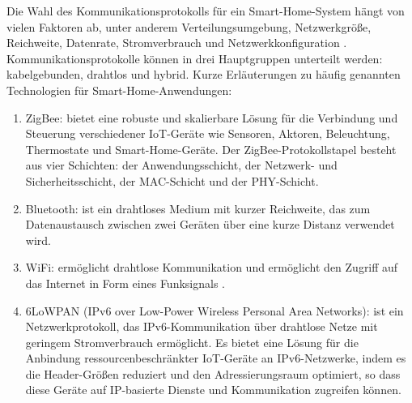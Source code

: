 Die Wahl des Kommunikationsprotokolls für ein Smart-Home-System hängt von vielen Faktoren ab, unter anderem Verteilungsumgebung, Netzwerkgröße, Reichweite, Datenrate, Stromverbrauch und Netzwerkkonfiguration \cite{djumanazarov2021overview}\cite{khatoun2022cybersecurity}. Kommunikationsprotokolle können in drei Hauptgruppen unterteilt werden: kabelgebunden, drahtlos und hybrid. Kurze Erläuterungen zu häufig genannten Technologien für Smart-Home-Anwendungen:
\begin{enumerate}
    \item ZigBee: bietet eine robuste und skalierbare Lösung für die Verbindung und Steuerung verschiedener IoT-Geräte wie Sensoren, Aktoren, Beleuchtung, Thermostate und Smart-Home-Geräte\cite{8203943}\cite{khatoun2022cybersecurity}.  Der ZigBee-Protokollstapel besteht aus vier Schichten: der Anwendungsschicht, der Netzwerk- und Sicherheitsschicht, der MAC-Schicht und der PHY-Schicht\cite{8203943}. 
    \item Bluetooth: ist ein drahtloses Medium mit kurzer Reichweite, das zum Datenaustausch zwischen zwei Geräten über eine kurze Distanz verwendet wird\cite{khatoun2022cybersecurity}. 

    \item WiFi: ermöglicht drahtlose Kommunikation und ermöglicht den Zugriff auf das Internet in Form eines Funksignals \cite{8203943}.

      \item 6LoWPAN (IPv6 over Low-Power Wireless Personal Area Networks): ist ein Netzwerkprotokoll, das IPv6-Kommunikation über drahtlose Netze mit geringem Stromverbrauch ermöglicht\cite{khatoun2022cybersecurity}. Es bietet eine Lösung für die Anbindung ressourcenbeschränkter IoT-Geräte an IPv6-Netzwerke, indem es die Header-Größen reduziert und den Adressierungsraum optimiert, so dass diese Geräte auf IP-basierte Dienste und Kommunikation zugreifen können\cite{khatoun2022cybersecurity}.
      

\end{enumerate}
